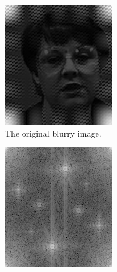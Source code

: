 \begin{figure}[H]
\captionsetup[subfigure]{justification=centering}
\centering
\begin{subfigure}{.4\textwidth}
    \centering
    \includegraphics[width=\linewidth]{figures/blurry_face.png}
    \caption{The original blurry image.}
    \label{fig:blurry_face}
\end{subfigure}
\begin{subfigure}{.4\textwidth}
    \centering
    \includegraphics[width=\linewidth]{figures/blurry_fft.png}

\end{subfigure}
\end{figure}
